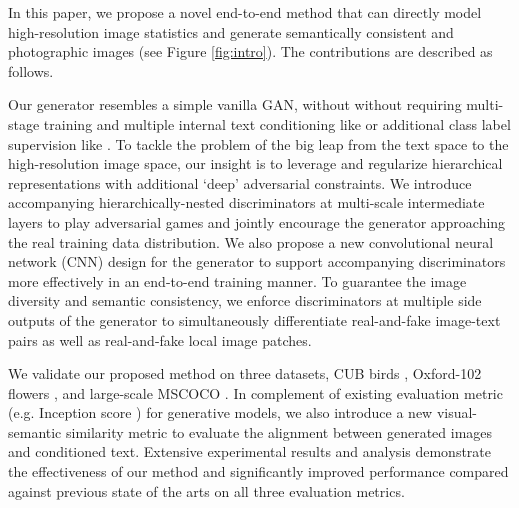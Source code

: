 \documentclass[10pt,twocolumn,letterpaper]{article}
\begin{document}
In this paper, we propose a novel end-to-end method that can directly model high-resolution image statistics and generate semantically consistent and photographic images (see Figure \ref{fig:intro}). The contributions are described as follows.

Our generator resembles a simple vanilla GAN, without without requiring multi-stage training and multiple internal text conditioning like \cite{han2017stackgan} or additional class label supervision like \cite{dash2017tac}. To tackle the problem of the big leap from the text space to the high-resolution image space, our insight is to leverage and regularize hierarchical representations with additional `deep' adversarial constraints. 
We introduce accompanying hierarchically-nested discriminators at multi-scale intermediate layers to play adversarial games and jointly encourage the generator approaching the real training data distribution. 
We also propose a new convolutional neural network (CNN) design for the generator to support accompanying discriminators more effectively in an end-to-end training manner.
To guarantee the image diversity and semantic consistency, we enforce discriminators at multiple side outputs of the generator to simultaneously differentiate real-and-fake image-text pairs as well as real-and-fake local image patches. %




We validate our proposed method on three datasets, CUB birds \cite{welinder2010caltech}, Oxford-102 flowers \cite{Nilsback08}, and large-scale MSCOCO \cite{lin2014microsoft}. In complement of existing evaluation metric (e.g. Inception score \cite{improvedGAN}) for generative models, we also introduce a new visual-semantic similarity metric to evaluate the alignment between generated images and conditioned text. Extensive experimental results and analysis demonstrate the effectiveness of our method and significantly improved performance compared against previous state of the arts on all three evaluation metrics. 
\end{document}
